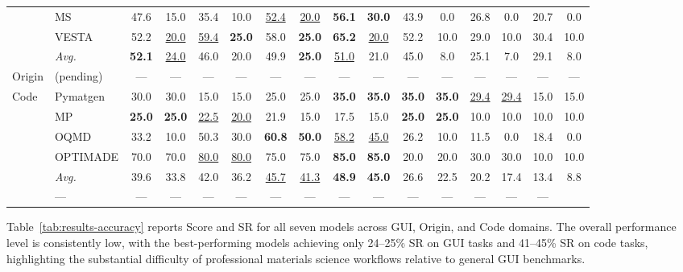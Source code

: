 \documentclass{article}
\begin{document}
\begin{table}[t]
{\begin{tabular}{ll cc cc cc cc cc cc cc}
  & MS       & 47.6 & 15.0 & 35.4 & 10.0 & \underline{52.4} & \underline{20.0} & \textbf{56.1} & \textbf{30.0} & 43.9 & 0.0 & 26.8 & 0.0 & 20.7 & 0.0 \\
  & VESTA    & 52.2 & \underline{20.0} & \underline{59.4} & \textbf{25.0} & 58.0 & \textbf{25.0} & \textbf{65.2} & \underline{20.0} & 52.2 & 10.0 & 29.0 & 10.0 & 30.4 & 10.0 \\
\cmidrule(lr){2-16}
\rowcolor[gray]{0.93}
  & \textit{Avg.} & \textbf{52.1} & \underline{24.0} & 46.0 & 20.0 & 49.9 & \textbf{25.0} & \underline{51.0} & 21.0 & 45.0 & 8.0 & 25.1 & 7.0 & 29.1 & 8.0 \\
\midrule
\rowcolor[gray]{0.93}
Origin & (pending) & --- & --- & --- & --- & --- & --- & --- & --- & --- & --- & --- & --- & --- & --- \\
\midrule
\multirow{5}{*}{Code}
  & Pymatgen & 30.0 & 30.0 & 15.0 & 15.0 & 25.0 & 25.0 & \textbf{35.0} & \textbf{35.0} & \textbf{35.0} & \textbf{35.0} & \underline{29.4} & \underline{29.4} & 15.0 & 15.0 \\
  & MP       & \textbf{25.0} & \textbf{25.0} & \underline{22.5} & \underline{20.0} & 21.9 & 15.0 & 17.5 & 15.0 & \textbf{25.0} & \textbf{25.0} & 10.0 & 10.0 & 10.0 & 10.0 \\
  & OQMD     & 33.2 & 10.0 & 50.3 & 30.0 & \textbf{60.8} & \textbf{50.0} & \underline{58.2} & \underline{45.0} & 26.2 & 10.0 & 11.5 & 0.0 & 18.4 & 0.0 \\
  & OPTIMADE & 70.0 & 70.0 & \underline{80.0} & \underline{80.0} & 75.0 & 75.0 & \textbf{85.0} & \textbf{85.0} & 20.0 & 20.0 & 30.0 & 30.0 & 10.0 & 10.0 \\
\cmidrule(lr){2-16}
\rowcolor[gray]{0.93}
  & \textit{Avg.} & 39.6 & 33.8 & 42.0 & 36.2 & \underline{45.7} & \underline{41.3} & \textbf{48.9} & \textbf{45.0} & 26.6 & 22.5 & 20.2 & 17.4 & 13.4 & 8.8 \\
\midrule
\rowcolor[gray]{0.93}
\multicolumn{2}{l}{\textbf{Overall Avg.}}
  & --- & --- & --- & --- & --- & --- & --- & --- & --- & --- & --- & --- & --- & --- \\
\bottomrule
\end{tabular}%
}
\end{table}

Table~\ref{tab:results-accuracy} reports Score and SR for all seven models across GUI, Origin,
and Code domains.
The overall performance level is consistently low, with the best-performing models
achieving only 24--25\% SR on GUI tasks and 41--45\% SR on code tasks,
highlighting the substantial difficulty of professional materials science workflows
relative to general GUI benchmarks.
\end{document}
